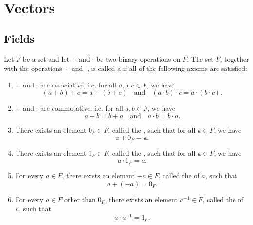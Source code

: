 \chapter{Vectors}\label{chap:vectors}

\section{Fields}

\begin{defn}
Let $ F $ be a set and let $ + $ and $ \cdot $ be two binary operations on $ F $. The set $ F $, together with the operations $ + $ and $ \cdot $, is called a  if all of the following axioms are satisfied:
\begin{enumerate}
    \item $ + $ and $ \cdot $ are associative, i.e. for all $ a,b,c\in F $, we have
    \begin{equation*}
        (a+b)+c=a+(b+c) \quad\text{and}\quad (a\cdot b)\cdot c=a\cdot(b\cdot c).
    \end{equation*}

    \item $ + $ and $ \cdot $ are commutative, i.e. for all $ a,b\in F $, we have
    \begin{equation*}
        a+b=b+a \quad\text{and}\quad a\cdot b=b\cdot a.
    \end{equation*}

    \item There exists an element $ 0_F\in F $, called the , such that for all $ a\in F $, we have
    \begin{equation*}
        a+0_F=a.
    \end{equation*}

    \item There exists an element $ 1_F\in F $, called the , such that for all $ a\in F $, we have
    \begin{equation*}
        a\cdot 1_F=a.
    \end{equation*}

    \item For every $ a\in F $, there exists an element $ -a\in F $, called the  of $ a $, such that
    \begin{equation*}
        a+(-a)=0_F.
    \end{equation*}

    \item For every $ a\in F $ other than $ 0_F $, there exists an element $ a^{-1}\in F $, called the  of $ a $, such that
    \begin{equation*}
        a\cdot a^{-1}=1_F.
    \end{equation*}


\end{enumerate}
\end{defn}
